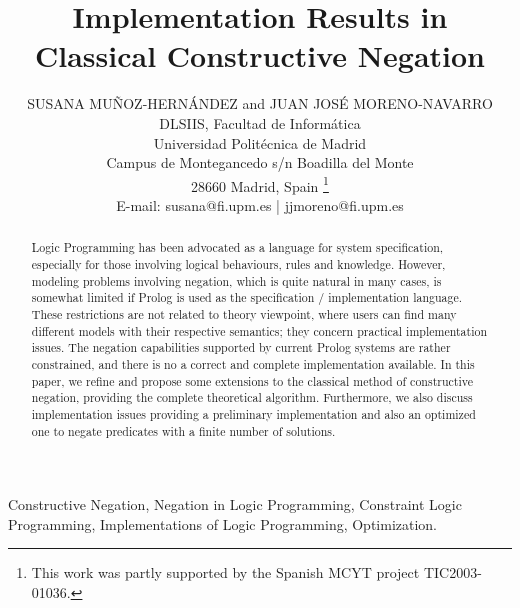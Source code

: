 \documentclass{tlp}
\begin{document}


\long{}


\title{Implementation Results in \\
       Classical Constructive Negation}

\author[S. Mu\~{n}oz-Hern\'{a}ndez and J.J. Moreno-Navarro]
{SUSANA MU\~{N}OZ-HERN\'{A}NDEZ and JUAN JOS\'{E} MORENO-NAVARRO \\
DLSIIS, Facultad de Inform\'{a}tica \\
Universidad Polit\'{e}cnica de  Madrid \\ 
Campus de Montegancedo s/n Boadilla del Monte\\
28660 Madrid, Spain \footnote{This work was partly supported by the
Spanish MCYT project TIC2003-01036.} \\
E-mail: susana@fi.upm.es | jjmoreno@fi.upm.es
}

\pagerange{\pageref{firstpage}--\pageref{lastpage}}
\setcounter{page}{1}

\maketitle

\label{firstpage}

\begin{abstract}
%
  Logic Programming has been advocated as a language for system
  specification, especially for those involving logical behaviours,
  rules and knowledge. However, modeling problems involving negation,
  which is quite natural in many cases, is somewhat limited if Prolog
  is used as the specification / implementation language. These
  restrictions are not related to theory viewpoint, where users can
  find many different models with their respective semantics; they
  concern practical implementation issues.  The negation capabilities
  supported by current Prolog systems are rather constrained, and
  there is no a correct and complete implementation available.  
  In this paper,
  we refine and propose some extensions to the classical method of
  constructive negation, providing the complete theoretical
  algorithm. Furthermore, we also discuss implementation issues
  providing a preliminary implementation and also an optimized
  one to negate predicates with a finite number of
  solutions.
\end{abstract}
\begin{keywords}
Constructive Negation, Negation in Logic Programming, Constraint Logic
Programming, Implementations of Logic Programming, Optimization.
\end{keywords}
\end{document}
